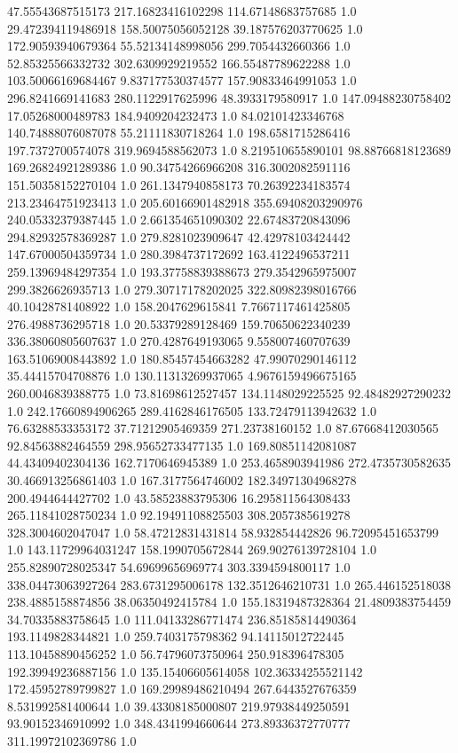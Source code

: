 47.55543687515173	217.16823416102298	114.67148683757685	1.0
29.472394119486918	158.50075056052128	39.187576203770625	1.0
172.90593940679364	55.52134148998056	299.7054432660366	1.0
52.85325566332732	302.6309929219552	166.55487789622288	1.0
103.50066169684467	9.837177530374577	157.90833464991053	1.0
296.8241669141683	280.1122917625996	48.3933179580917	1.0
147.09488230758402	17.05268000489783	184.9409204232473	1.0
84.02101423346768	140.74888076087078	55.21111830718264	1.0
198.6581715286416	197.7372700574078	319.9694588562073	1.0
8.219510655890101	98.88766818123689	169.26824921289386	1.0
90.34754266966208	316.3002082591116	151.50358152270104	1.0
261.1347940858173	70.26392234183574	213.23464751923413	1.0
205.60166901482918	355.69408203290976	240.05332379387445	1.0
2.661354651090302	22.67483720843096	294.82932578369287	1.0
279.8281023909647	42.42978103424442	147.67000504359734	1.0
280.3984737172692	163.4122496537211	259.13969484297354	1.0
193.37758839388673	279.3542965975007	299.3826626935713	1.0
279.30717178202025	322.80982398016766	40.10428781408922	1.0
158.2047629615841	7.7667117461425805	276.4988736295718	1.0
20.53379289128469	159.70650622340239	336.38060805607637	1.0
270.4287649193065	9.558007460707639	163.51069008443892	1.0
180.85457454663282	47.99070290146112	35.44415704708876	1.0
130.11313269937065	4.9676159496675165	260.0046839388775	1.0
73.81698612527457	134.1148029225525	92.48482927290232	1.0
242.17660894906265	289.4162846176505	133.72479113942632	1.0
76.63288533353172	37.71212905469359	271.23738160152	1.0
87.67668412030565	92.84563882464559	298.95652733477135	1.0
169.80851142081087	44.43409402304136	162.7170646945389	1.0
253.4658903941986	272.4735730582635	30.466913256861403	1.0
167.3177564746002	182.34971304968278	200.4944644427702	1.0
43.58523883795306	16.295811564308433	265.11841028750234	1.0
92.19491108825503	308.2057385619278	328.3004602047047	1.0
58.47212831431814	58.932854442826	96.72095451653799	1.0
143.11729964031247	158.1990705672844	269.90276139728104	1.0
255.82890728025347	54.69699656969774	303.3394594800117	1.0
338.04473063927264	283.6731295006178	132.3512646210731	1.0
265.446152518038	238.4885158874856	38.06350492415784	1.0
155.18319487328364	21.4809383754459	34.70335883758645	1.0
111.04133286771474	236.85185814490364	193.1149828344821	1.0
259.7403175798362	94.14115012722445	113.10458890456252	1.0
56.74796073750964	250.918396478305	192.39949236887156	1.0
135.15406605614058	102.36334255521142	172.45952789799827	1.0
169.29989486210494	267.6443527676359	8.531992581400644	1.0
39.43308185000807	219.97938449250591	93.90152346910992	1.0
348.4341994660644	273.89336372770777	311.19972102369786	1.0
